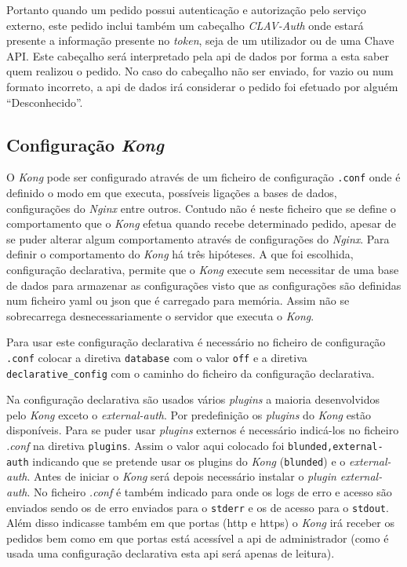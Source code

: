 Portanto quando um pedido possui autenticação e autorização pelo serviço externo, este pedido inclui também um cabeçalho \textit{CLAV-Auth} onde estará presente a informação presente no \textit{token}, seja de um utilizador ou de uma Chave API. Este cabeçalho será interpretado pela \acrshort{api} de dados por forma a esta saber quem realizou o pedido. No caso do cabeçalho não ser enviado, for vazio ou num formato incorreto, a \acrshort{api} de dados irá considerar o pedido foi efetuado por alguém ``Desconhecido''.

\subsection{Configuração \textit{Kong}}
O \textit{Kong} pode ser configurado através de um ficheiro de configuração \texttt{.conf} onde é definido o modo em que executa, possíveis ligações a bases de dados, configurações do \textit{Nginx} entre outros. Contudo não é neste ficheiro que se define o comportamento que o \textit{Kong} efetua quando recebe determinado pedido, apesar de se puder alterar algum comportamento através de configurações do \textit{Nginx}. Para definir o comportamento do \textit{Kong} há três hipóteses. A que foi escolhida, configuração declarativa, permite que o \textit{Kong} execute sem necessitar de uma base de dados para armazenar as configurações visto que as configurações são definidas num ficheiro \acrshort{yaml} ou \acrshort{json} que é carregado para memória. Assim não se sobrecarrega desnecessariamente o servidor que executa o \textit{Kong}.

Para usar este configuração declarativa é necessário no ficheiro de configuração \texttt{.conf} colocar a diretiva \texttt{database} com o valor \texttt{off} e a diretiva \texttt{declarative\_config} com o caminho do ficheiro da configuração declarativa.

Na configuração declarativa são usados vários \textit{plugins} a maioria desenvolvidos pelo \textit{Kong} exceto o \textit{external-auth}. Por predefinição os \textit{plugins} do \textit{Kong} estão disponíveis. Para se puder usar \textit{plugins} externos é necessário indicá-los no ficheiro \textit{.conf} na diretiva \texttt{plugins}. Assim o valor aqui colocado foi \texttt{blunded,external-auth} indicando que se pretende usar os plugins do \textit{Kong} (\texttt{blunded}) e o \textit{external-auth}. Antes de iniciar o \textit{Kong} será depois necessário instalar o \textit{plugin} \textit{external-auth}. No ficheiro \textit{.conf} é também indicado para onde os logs de erro e acesso são enviados sendo os de erro enviados para o \texttt{stderr} e os de acesso para o \texttt{stdout}. Além disso indicasse também em que portas (\acrshort{http} e \acrshort{https}) o \textit{Kong} irá receber os pedidos bem como em que portas está acessível a \acrshort{api} de administrador (como é usada uma configuração declarativa esta \acrshort{api} será apenas de leitura).

